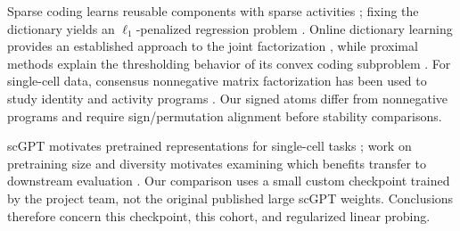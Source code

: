 Sparse coding learns reusable components with sparse activities
\cite{olshausen1996}; fixing the dictionary yields an $\ell_1$-penalized
regression problem \cite{tibshirani1996}. Online dictionary learning provides
an established approach to the joint factorization \cite{mairal2010}, while
proximal methods explain the thresholding behavior of its convex coding
subproblem \cite{beck2009}. For single-cell data, consensus nonnegative matrix
factorization has been used to study identity and activity programs
\cite{kotliar2019}. Our signed atoms differ from nonnegative programs and
require sign/permutation alignment before stability comparisons.

scGPT motivates pretrained representations for single-cell tasks
\cite{cui2024}; work on pretraining size and diversity motivates examining
which benefits transfer to downstream evaluation \cite{denadel2026}. Our
comparison uses a small custom checkpoint trained by the project team,
not the original published large scGPT weights. Conclusions therefore concern
this checkpoint, this cohort, and regularized linear probing.
